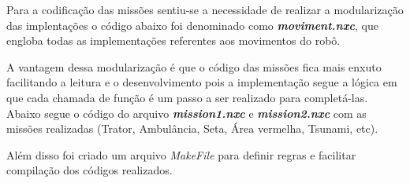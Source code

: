 Para a codificação das missões sentiu-se a necessidade de realizar a modularização das implentações o código abaixo foi denominado como \textbf{\textit{moviment.nxc}}, que engloba todas as implementações referentes aos movimentos do robô.



A vantagem dessa modularização é que o código das missões fica mais enxuto facilitando a leitura e o desenvolvimento pois a implementação segue a lógica em que cada chamada de função é um passo a ser realizado para completá-las. Abaixo segue o código do arquivo \textbf{\textit{mission1.nxc}} e \textbf{\textit{mission2.nxc}} com as missões realizadas (Trator, Ambulância, Seta, Área vermelha, Tsunami, etc).










Além disso foi criado um arquivo \textit{MakeFile} para definir regras e facilitar compilação dos códigos realizados.



